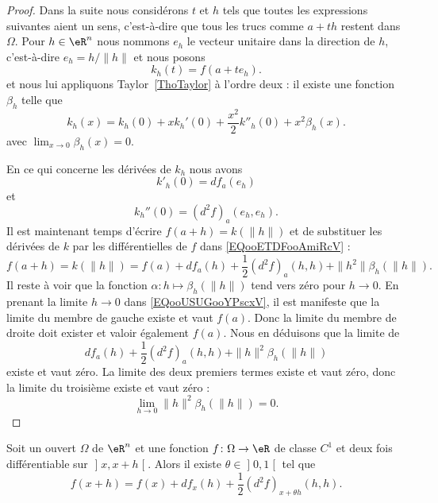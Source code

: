 \begin{proof}
	Dans la suite nous considérons \( t\) et \( h\) tels que toutes les expressions suivantes aient un sens, c'est-à-dire que tous les trucs comme \( a+th\) restent dans \( \Omega\). Pour \( h\in \eR^n\) nous nommons \( e_h\) le vecteur unitaire dans la direction de \( h\), c'est-à-dire \( e_h=h/\| h \|\) et nous posons
	\begin{equation}
		k_h(t)=f(a+te_h).
	\end{equation}
	et nous lui appliquons Taylor~\ref{ThoTaylor} à l'ordre deux : il existe une fonction \( \beta_h\) telle que
	\begin{equation}        \label{EQooETDFooAmiRcV}
		k_h(x)=k_h(0)+xk_h'(0)+\frac{ x^2 }{2}k''_h(0)+x^2\beta_h(x).
	\end{equation}
	avec \( \lim_{x\to 0} \beta_h(x)=0\).

	En ce qui concerne les dérivées de \( k_h\) nous avons
	\begin{equation}
		k'_h(0)=df_a(e_h)
	\end{equation}
	et
	\begin{equation}
		k_h''(0)=(d^2f)_{a}(e_h,e_h).
	\end{equation}
	Il est maintenant temps d'écrire \( f(a+h)=k(\| h \|)\) et de substituer les dérivées de \( k\) par les différentielles de \( f\) dans \eqref{EQooETDFooAmiRcV} :
	\begin{equation}        \label{EQooUSUGooYPscxV}
		f(a+h)=k(\| h \|)=f(a)+df_a(h)+\frac{ 1 }{2}(d^2f)_a(h,h)+\| h^2 \|\beta_{h}(\| h \|).
	\end{equation}
	Il reste à voir que la fonction \( \alpha\colon h\mapsto \beta_h(\| h \|)\) tend vers zéro pour \( h\to 0\). En prenant la limite \( h\to 0\) dans \eqref{EQooUSUGooYPscxV}, il est manifeste que la limite du membre de gauche existe et vaut \( f(a)\). Donc la limite du membre de droite doit exister et valoir également \( f(a)\). Nous en déduisons que la limite de
	\begin{equation}
		df_a(h)+\frac{ 1 }{2}(d^2f)_a(h,h)+\| h \|^2\beta_h(\| h \|)
	\end{equation}
	existe et vaut zéro. La limite des deux premiers termes existe et vaut zéro, donc la limite du troisième existe et vaut zéro :
	\begin{equation}
		\lim_{h\to 0} \| h \|^2\beta_h(\| h \|)=0.
	\end{equation}
\end{proof}

\begin{proposition}     \label{PROPooWWMYooPOmSds}
	Soit un ouvert \( \Omega\) de \( \eR^n\) et une fonction \( f\colon \Omega\to \eR\) de classe \( C^1\) et deux fois différentiable sur \( \mathopen] x , x+h \mathclose[\). Alors il existe \( \theta\in \mathopen] 0 , 1 \mathclose[\) tel que
	\begin{equation}
		f(x+h)=f(x)+df_x(h)+\frac{ 1 }{2}(d^2f)_{x+\theta h}(h,h).
	\end{equation}
\end{proposition}

